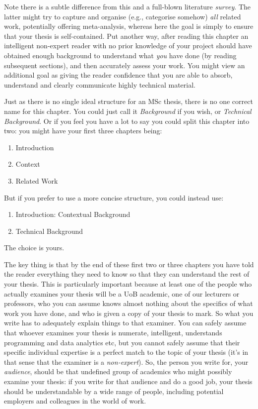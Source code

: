 \documentclass[ %
                    author={James Stephenson},
                supervisor={Dr. Edwin Simpson},
                    degree={MSc},
                     title={Bayesian Deep Learning For Extractive Test Summarisation},
                  subtitle={},
                      type={},
                      year={2023}]{../additions/dissertation}
\begin{document}
		Note there is a subtle difference from
		this and a full-blown literature {\em survey}.  The latter might try
		to capture and organise (e.g., categorise somehow) {\em all}\/ related work,
		potentially offering meta-analysis, whereas here the goal is simply to
		ensure that your thesis is self-contained.  Put another way, after reading 
		this chapter an intelligent non-expert reader with no prior knowledge of your project should have obtained enough background to 
		understand what {\em you}\/ have done (by reading subsequent sections), and then 
		accurately assess your work.  You might view an additional goal as giving 
		the reader confidence that you are able to absorb, understand and clearly 
		communicate highly technical material.
		
		Just as there is no single ideal structure for an MSc thesis, there is no one correct name for this chapter. You could just call it {\em Background}\/ if you wish, or {\em Technical Background}. Or if you feel you have a lot to say you could split this chapter into two: you might have your first three chapters being:
		\begin{enumerate}
			\item Introduction
			\item Context
			\item Related Work
		\end{enumerate}
			\noindent
			But if you prefer to use a more concise structure, you could instead use:
		\begin{enumerate}
			\item Introduction: Contextual Background
			\item Technical Background
		\end{enumerate}
		\noindent
		The choice is yours. 
		
		
		The key thing is that by the end of these first two or three chapters you have told the reader everything they need to know so that they can understand the rest of your thesis. This is particularly important because at least one of the people who actually examines your thesis will be a UoB academic, one of our lecturers or professors, who you can assume knows almost nothing about the specifics of what work you have done, and who is given a copy of your thesis to mark. So what you write has to adequately explain things to that examiner. You can safely assume that whoever examines your thesis is numerate, intelligent, understands programming and data analytics etc, but you cannot safely assume that their specific individual expertise is a perfect match to the topic of your thesis (it's in that sense that the examiner is a {\em non-expert}). So, the person you write for, your {\em audience}, should be that undefined group of academics who might possibly examine your thesis: if you write for that audience and do a good job, your thesis should be understandable by a wide range of people, including potential employers and colleagues in the world of work.
		
\end{document}
